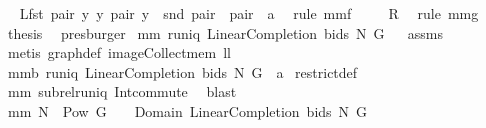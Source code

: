 \begin{isabellebody}
%
\isadelimproof
%
\endisadelimproof
%
\isatagproof
{}\isamarkupfalse%
\ {\isacharminus}\isanewline
{}\isamarkupfalse%
\ {\isachardoublequoteopen}{\isacharquery}L{\isacharequal}{\isacharbraceleft}{\isacharparenleft}fst\ pair{\isacharcomma}\ {\isacharbraceleft}y{\isacharbraceright}{\isacharparenright}{\isacharbar}\ y\ pair{\isachardot}\ y\ {\isasymin}\ snd\ pair\ {\isacharampersand}\ pair\ {\isasymin}\ a{\isacharbraceright}{\isachardoublequoteclose}\ \isamarkupfalse%
\ {\isacharparenleft}rule\ mm{}{}f{\isacharparenright}\isanewline
{}\isamarkupfalse%
\ \isamarkupfalse%
\ {\isachardoublequoteopen}{\isachardot}{\isachardot}{\isachardot}\ {\isacharequal}\ {\isacharquery}R{\isachardoublequoteclose}\ \isamarkupfalse%
\ {\isacharparenleft}rule\ mm{}{}g{\isacharparenright}\ \isamarkupfalse%
\ \isamarkupfalse%
\ {\isacharquery}thesis\ \isamarkupfalse%
\ presburger\isanewline
{}\isamarkupfalse%
%
\endisatagproof
{\isafoldproof}%
%
\isadelimproof
\isanewline
%
\endisadelimproof
\isanewline
{}\isamarkupfalse%
\ mm{}{}{\isacharcolon}\ {\isachardoublequoteopen}runiq\ {\isacharparenleft}LinearCompletion\ bids\ N\ G{\isacharparenright}{\isachardoublequoteclose}%
\isadelimproof
\ %
\endisadelimproof
%
\isatagproof
{}\isamarkupfalse%
\ assms\ \isamarkupfalse%
\ {\isacharparenleft}metis\ graph{\isacharunderscore}def\ image{\isacharunderscore}Collect{\isacharunderscore}mem\ ll{}{}{\isacharparenright}%
\endisatagproof
{\isafoldproof}%
%
\isadelimproof
%
\endisadelimproof
\isanewline
{}\isamarkupfalse%
\ mm{}{}b{\isacharcolon}\ {\isachardoublequoteopen}runiq\ {\isacharparenleft}LinearCompletion\ bids\ N\ G\ {\isacharbar}{\isacharbar}\ a{\isacharparenright}{\isachardoublequoteclose}\isanewline
%
\isadelimproof
%
\endisadelimproof
%
\isatagproof
{}\isamarkupfalse%
\ restrict{\isacharunderscore}def\ \isamarkupfalse%
\ mm{}{}\ subrel{\isacharunderscore}runiq\ Int{\isacharunderscore}commute\ \isamarkupfalse%
\ blast%
\endisatagproof
{\isafoldproof}%
%
\isadelimproof
\isanewline
%
\endisadelimproof
{}\isamarkupfalse%
\ mm{}{}{\isacharcolon}\ {\isachardoublequoteopen}N\ {\isasymtimes}\ {\isacharparenleft}Pow\ G\ {\isacharminus}\ {\isacharbraceleft}{\isacharbraceleft}{\isacharbraceright}{\isacharbraceright}{\isacharparenright}\ {\isacharequal}\ Domain\ {\isacharparenleft}LinearCompletion\ bids\ N\ G{\isacharparenright}{\isachardoublequoteclose}%

\end{isabellebody}
